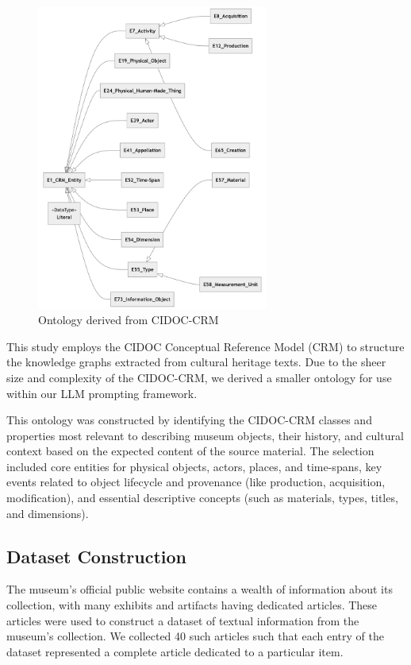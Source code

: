 \documentclass[a4, conference]{IEEEtran}
\begin{document}
\begin{figure}[!t]
    \centering
    \includegraphics[width=3in]{assets/ontology}
    \caption{Ontology derived from CIDOC-CRM}
    \label{fig_ontology}
\end{figure}

This study employs the CIDOC Conceptual Reference Model (CRM) to structure the knowledge graphs extracted from cultural heritage texts. Due to the sheer size and complexity of the CIDOC-CRM, we derived a smaller ontology for use within our LLM prompting framework.

This ontology was constructed by identifying the CIDOC-CRM classes and properties most relevant to describing museum objects, their history, and cultural context based on the expected content of the source material. The selection included core entities for physical objects, actors, places, and time-spans, key events related to object lifecycle and provenance (like production, acquisition, modification), and essential descriptive concepts (such as materials, types, titles, and dimensions).

\subsection{Dataset Construction}

The museum's official public website contains a wealth of information about its collection, with many exhibits and artifacts having dedicated articles. These articles were used to construct a dataset of textual information from the museum's collection. We collected 40 such articles such that each entry of the dataset represented a complete article dedicated to a particular item.
\end{document}

